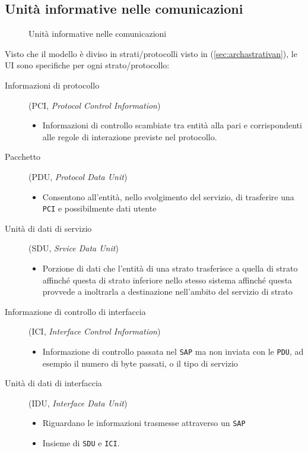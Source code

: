 \subsection{Unità informative nelle comunicazioni}
\label{sec:uninfoenellecom}
\begin{figure}[ht!]
  \centering
  
  \caption{Unità informative nelle comunicazioni}
  \label{fig:uniInfoCom}
\end{figure}
Visto che il modello è diviso in strati/protocolli visto in (\ref{sec:archastrativan}), le UI sono specifiche per
ogni strato/protocollo:
\begin{description}
\item[Informazioni di protocollo] (PCI, \textit{Protocol Control Information})
  \begin{itemize}
  \item Informazioni di controllo scambiate tra entità alla pari e corrispondenti alle regole di interazione
    previste nel protocollo.
  \end{itemize}
\item[Pacchetto] (PDU, \textit{Protocol Data Unit})
  \begin{itemize}
  \item Consentono all'entità, nello svolgimento del servizio, di trasferire una \texttt{PCI} e possibilmente
    dati utente
  \end{itemize}
\item[Unità di dati di servizio] (SDU, \textit{Srvice Data Unit})
  \begin{itemize}
  \item Porzione di dati che l'entità di una strato trasferisce a quella di strato affinché questa di strato
    inferiore nello stesso sistema affinché questa provvede a inoltrarla a destinazione nell'ambito del servizio
    di strato
  \end{itemize}
\item[Informazione di controllo di interfaccia] (ICI, \textit{Interface Control Information})
  \begin{itemize}
  \item Informazione di controllo passata nel \texttt{SAP} ma non inviata con le \texttt{PDU}, ad esempio il
    numero di byte passati, o il tipo di servizio 
  \end{itemize}
\item[Unità di dati di interfaccia] (IDU, \textit{Interface Data Unit})
  \begin{itemize}
  \item Riguardano le informazioni trasmesse attraverso un \texttt{SAP}
  \item Insieme di \texttt{SDU} e \texttt{ICI}.
  \end{itemize}
\end{description}
\clearpage
